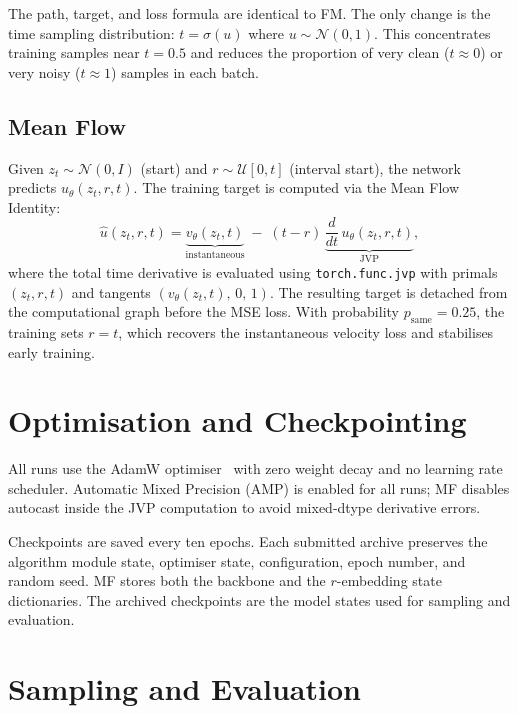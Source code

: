 The path, target, and loss formula are identical to FM. The only change is the
time sampling distribution: $t = \sigma(u)$ where $u \sim \mathcal{N}(0, 1)$.
This concentrates training samples near $t=0.5$ and reduces the proportion of
very clean ($t\approx 0$) or very noisy ($t\approx 1$) samples in each batch.

\subsection{Mean Flow}

Given $z_t \sim \mathcal{N}(0, I)$ (start) and $r \sim \mathcal{U}[0, t]$ (interval
start), the network predicts $u_\theta(z_t, r, t)$. The training target is
computed via the Mean Flow Identity:
\begin{equation}
  \hat{u}(z_t, r, t)
    = \underbrace{v_\theta(z_t, t)}_{\text{instantaneous}} \;-\;
      (t - r)\,\underbrace{\frac{d}{dt}\,u_\theta(z_t, r, t)}_{\text{JVP}},
\end{equation}
where the total time derivative is evaluated using \texttt{torch.func.jvp} with
primals $(z_t, r, t)$ and tangents $(v_\theta(z_t, t),\, 0,\, 1)$. The
resulting target is detached from the computational graph before the MSE loss.
With probability $p_\text{same} = 0.25$, the training sets $r = t$, which
recovers the instantaneous velocity loss and stabilises early training.

\section{Optimisation and Checkpointing}

All runs use the AdamW optimiser~\cite{loshchilov2019adamw} with zero weight
decay and no learning rate scheduler. Automatic Mixed Precision (AMP) is enabled
for all runs; MF disables autocast inside the JVP computation to avoid
mixed-dtype derivative errors.

Checkpoints are saved every ten epochs. Each submitted archive preserves the
algorithm module state, optimiser state, configuration, epoch number, and random
seed. MF stores both the backbone and the $r$-embedding state dictionaries. The
archived checkpoints are the model states used for sampling and evaluation.

\section{Sampling and Evaluation}\label{sec:sampling}

